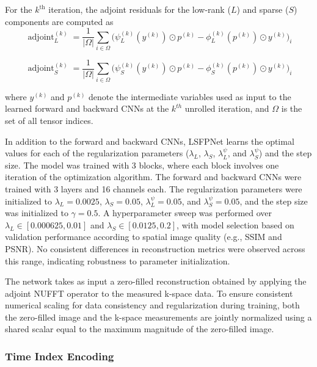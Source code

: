 \documentclass[runningheads]{llncs}
\begin{document}
For the $k^{\text{th}}$ iteration, the adjoint residuals for the low-rank ($L$) and
sparse ($S$) components are computed as
\[
\operatorname{adjoint}_L^{(k)}
= \frac{1}{|\Omega|}\sum_{i\in\Omega}
\Big(
\psi_L^{(k)}(y^{(k)}) \odot p^{(k)}
-
\phi_L^{(k)}(p^{(k)}) \odot y^{(k)}
\Big)_i 
\]

\[
\operatorname{adjoint}_S^{(k)}
= \frac{1}{|\Omega|}\sum_{i\in\Omega}
\Big(
\psi_S^{(k)}(y^{(k)}) \odot p^{(k)}
-
\phi_S^{(k)}(p^{(k)}) \odot y^{(k)}
\Big)_i
\]

where $y^{(k)}$ and $p^{(k)}$ denote the intermediate variables used as input to the learned forward and backward CNNs at the $k^{th}$ unrolled iteration, and $\Omega$ is the set of all tensor indices. 

In addition to the forward and backward CNNs, LSFPNet learns the optimal values for each of the regularization parameters ($\lambda_{L}$, $\lambda_{S}$, $\lambda_{L}^\psi$, and $\lambda_{S}^\psi$) and the step size. The model was trained with 3 blocks, where each block involves one iteration of the optimization algorithm. The forward and backward CNNs were trained with 3 layers and 16 channels each. The regularization parameters were initialized to $\lambda_{L}=0.0025$, $\lambda_{S}=0.05$, $\lambda_{L}^\psi=0.05$, and $\lambda_{S}^\psi=0.05$, and the step size was initialized to $\gamma=0.5$. A hyperparameter sweep was performed over $\lambda_L \in [0.000625, 0.01]$ and $\lambda_S \in [0.0125, 0.2]$, with model selection based on validation performance according to spatial image quality (e.g., SSIM and PSNR). No consistent differences in reconstruction metrics were observed across this range, indicating robustness to parameter initialization. 

The network takes as input a zero-filled reconstruction obtained by applying the adjoint NUFFT operator to the measured k-space data. To ensure consistent numerical scaling for data consistency and regularization during training, both the zero-filled image and the k-space measurements are jointly normalized using a shared scalar equal to the maximum magnitude of the zero-filled image.


\subsubsection{Time Index Encoding} 
\end{document}
